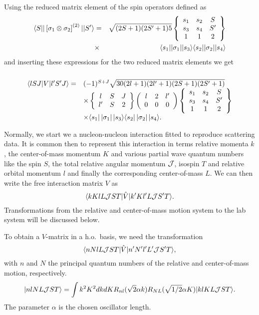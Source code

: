 Using the  reduced matrix element of the spin 
operators defined as
\begin{eqnarray*}
\langle S | |\left[{\bf \sigma}_1 \otimes {\bf \sigma}_2\right]^{(2)} | |S'\rangle
& = & 
\sqrt{(2S+1)(2S'+1)5}
\left\{\begin{array}{ccc} s_1&s_2&S \\s_3&s_4&S' \\ 1&1&2\end{array}\right\}\\
&\times& 
\langle s_1 | | {\bf \sigma}_1 | |s_3\rangle
\langle s_2 | | {\bf \sigma}_2 | |s_4\rangle
\end{eqnarray*}
and inserting  these expressions for the two reduced matrix elements we get 
\[
\begin{array}{ll}
&\\
\langle lSJ |V|l'S'J\rangle =&(-1)^{S+J}\sqrt{30(2l+1)(2l'+1)(2S+1)(2S'+1)}\\
&\times\left\{\begin{array}{ccc}l&S &J \\l'&S&2\end{array}\right\}
\left(\begin{array}{ccc}l&2&l'\\0&0&0\end{array}\right)
\left\{\begin{array}{ccc}s_{1}&s_{2}&S\\s_{3}&s_{4}&S'\\
1&1&2\end{array}
\right\}\\
&\times\langle s_{1} |\left | \sigma_{1}\right | |s_{3}\rangle
\langle s_{2} |\left | \sigma_{2}\right | |s_{4}\rangle.
\end{array}
\]

Normally, we start we a nucleon-nucleon interaction fitted to reproduce scattering data.
It is common then to represent this interaction in terms relative momenta $k$, the center-of-mass momentum $K$
and various partial wave quantum numbers like the spin $S$, the total relative angular  momentum ${\cal J}$, isospin $T$ and relative orbital momentum $l$ and finally the corresponding center-of-mass $L$.  
We can then write the  free interaction matrix $V$ as
\[
    \langle kKlL{\cal J}ST |\hat{V}|k'Kl'L{\cal J}S'T\rangle.\label{eq:freeg2}
\]
Transformations from the relative and center-of-mass motion
system to the lab system will be discussed
below.

To obtain a $V$-matrix in a h.o.~basis, we need  
the transformation
\[
     \langle nNlL{\cal J}ST |\hat{V}|n'N'l'L'{\cal J}S'T\rangle,
\]
with $n$ and $N$ the principal quantum numbers of the relative and
center-of-mass motion, respectively.
\[
   |nlNL{\cal J}ST\rangle= \int k^{2}K^{2}dkdKR_{nl}(\sqrt{2}\alpha k)
R_{NL}(\sqrt{1/2}\alpha K)
|klKL{\cal J}ST\rangle.
\]
The parameter $\alpha$ is the chosen oscillator length.


